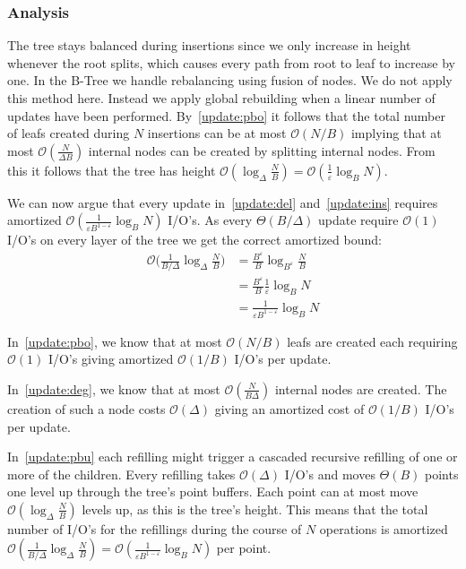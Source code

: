 \documentclass[twoside,11pt,openright]{report}
\def \epsilon {\varepsilon}
\begin{document}
\subsubsection*{Analysis}
The tree stays balanced during insertions since we only increase in height whenever the root splits, which causes every path from root to leaf to increase by one. In the B-Tree we handle rebalancing using fusion of nodes. We do not apply this method here. Instead we apply global rebuilding when a linear number of updates have been performed. By~\ref{update:pbo} it follows that the total number of leafs created during $N$ insertions can be at most $\mathcal{O}(N/B)$ implying that at most $\mathcal{O}(\frac{N}{\Delta B})$ internal nodes can be created by splitting internal nodes. From this it follows that the tree has height $\mathcal{O}(\log_\Delta \frac{N}{B}) = \mathcal{O}(\frac{1}{\epsilon} \log_B N)$.

We can now argue that every update in~\ref{update:del} and~\ref{update:ins} requires amortized $\mathcal{O}(\frac{1}{\epsilon B^{1-\epsilon}} \log_B N)$ I/O's. As every $\Theta (B/\Delta)$ update require $\mathcal{O}(1)$ I/O's on every layer of the tree we get the correct amortized bound:
\begin{align*}
\mathcal{O}\bigg(\frac{1}{B/\Delta} \log_\Delta \frac{N}{B}\bigg) &= \frac{B^\epsilon}{B} \log_{B^\epsilon} \frac{N}{B} \\
&= \frac{B^\epsilon}{B} \frac{1}{\epsilon} \log_{B} N \\
&= \frac{1}{\epsilon B^{1-\epsilon}} \log_B N
\end{align*}

In~\ref{update:pbo}, we know that at most $\mathcal{O}(N/B)$ leafs are created each requiring $\mathcal{O}(1)$ I/O's giving amortized $\mathcal{O}(1/B)$ I/O's per update.

In~\ref{update:deg}, we know that at most $\mathcal{O}(\frac{N}{B\Delta})$ internal nodes are created. The creation of such a node costs $\mathcal{O}(\Delta)$ giving an amortized cost of $\mathcal{O}(1/B)$ I/O's per update.

In~\ref{update:pbu} each refilling might trigger a cascaded recursive refilling of one or more of the children. Every refilling takes $\mathcal{O}(\Delta)$ I/O's and moves $\Theta(B)$ points one level up through the tree's point buffers. Each point can at most move $\mathcal{O}(\log_\Delta \frac{N}{B})$ levels up, as this is the tree's height. This means that the total number of I/O's for the refillings during the course of $N$ operations is amortized $\mathcal{O}(\frac{1}{B/\Delta} \log_\Delta \frac{N}{B}) = \mathcal{O}(\frac{1}{\epsilon B^{1-\epsilon}} \log_B N)$ per point.
\end{document}
